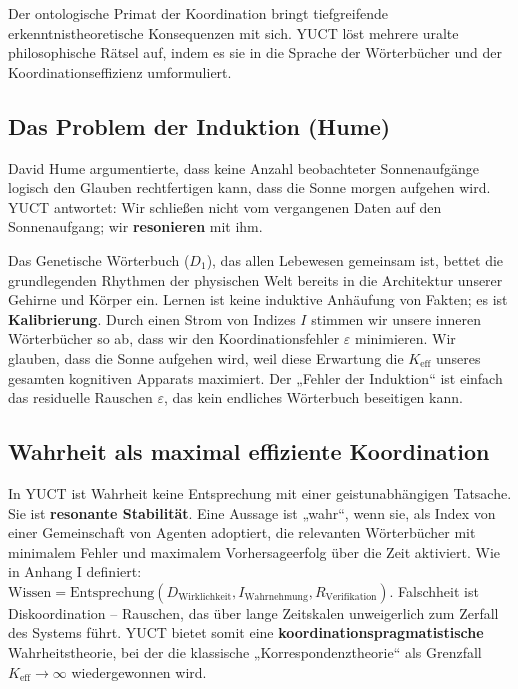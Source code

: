 \documentclass[12pt,a4paper]{article}
\newcommand{\Keff}{K_{\mathrm{eff}}}
\begin{document}
	Der ontologische Primat der Koordination bringt tiefgreifende erkenntnistheoretische Konsequenzen mit sich. YUCT löst mehrere uralte philosophische Rätsel auf, indem es sie in die Sprache der Wörterbücher und der Koordinationseffizienz umformuliert.
	
	\subsection{Das Problem der Induktion (Hume)}
	
	David Hume argumentierte, dass keine Anzahl beobachteter Sonnenaufgänge logisch den Glauben rechtfertigen kann, dass die Sonne morgen aufgehen wird. YUCT antwortet: Wir schließen nicht vom vergangenen Daten auf den Sonnenaufgang; wir \textbf{resonieren} mit ihm.
	
	Das Genetische Wörterbuch (\(D_1\)), das allen Lebewesen gemeinsam ist, bettet die grundlegenden Rhythmen der physischen Welt bereits in die Architektur unserer Gehirne und Körper ein. Lernen ist keine induktive Anhäufung von Fakten; es ist \textbf{Kalibrierung}. Durch einen Strom von Indizes \(I\) stimmen wir unsere inneren Wörterbücher so ab, dass wir den Koordinationsfehler \(\varepsilon\) minimieren. Wir glauben, dass die Sonne aufgehen wird, weil diese Erwartung die \(\Keff\) unseres gesamten kognitiven Apparats maximiert. Der „Fehler der Induktion“ ist einfach das residuelle Rauschen \(\varepsilon\), das kein endliches Wörterbuch beseitigen kann.
	
	\subsection{Wahrheit als maximal effiziente Koordination}
	
	In YUCT ist Wahrheit keine Entsprechung mit einer geistunabhängigen Tatsache. Sie ist \textbf{resonante Stabilität}. Eine Aussage ist „wahr“, wenn sie, als Index von einer Gemeinschaft von Agenten adoptiert, die relevanten Wörterbücher mit minimalem Fehler und maximalem Vorhersageerfolg über die Zeit aktiviert. Wie in Anhang I definiert: \(\text{Wissen} = \text{Entsprechung}(D_{\text{Wirklichkeit}}, I_{\text{Wahrnehmung}}, R_{\text{Verifikation}})\). Falschheit ist Diskoordination – Rauschen, das über lange Zeitskalen unweigerlich zum Zerfall des Systems führt. YUCT bietet somit eine \textbf{koordinationspragmatistische} Wahrheitstheorie, bei der die klassische „Korrespondenztheorie“ als Grenzfall \(\Keff \to \infty\) wiedergewonnen wird.
	
\end{document}
